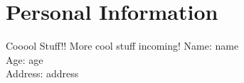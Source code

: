 \documentclass{article}
\begin{document}
\section{Personal Information}
Cooool Stuff!!
More cool stuff incoming!
Name: {{name}} \\
Age: {{age}} \\
Address: {{address}}
\end{document}
